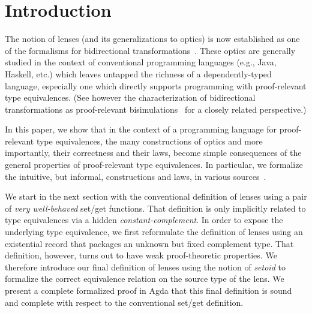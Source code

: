 \documentclass[sigplan,review,anonymous]{acmart}
\begin{document}
\section{Introduction}

The notion of lenses (and its generalizations to optics) is now
established as one of the formalisms for bidirectional
transformations~\cite{eaab8672ebea42538109e9f72ece5ed0}. These optics
are generally studied in the context of conventional programming
languages (e.g., Java, Haskell, etc.) which leaves untapped the
richness of a dependently-typed language, especially one which
directly supports programming with proof-relevant type
equivalences. (See however the characterization of bidirectional
transformations as proof-relevant
bisimulations~\cite{eaab8672ebea42538109e9f72ece5ed0} for a closely
related perspective.)

In this paper, we show that in the context of a programming language
for proof-relevant type equivalences, the many constructions of optics
and more importantly, their correctness and their laws, become simple
consequences of the general properties of proof-relevant type
equivalences. In particular, we formalize the intuitive, but informal,
constructions and laws, in various
sources~\cite{oleg-blog,Miltner:2017:SBL:3177123.3158089,laarhoven}.

We start in the next section with the conventional definition of
lenses using a pair of \emph{very well-behaved} set/get
functions. That definition is only implicitly related to type
equivalences via a hidden \emph{constant-complement}. In order to
expose the underlying type equivalence, we first reformulate the
definition of lenses using an existential record that packages an
unknown but fixed complement type. That definition, however, turns out
to have weak proof-theoretic properties. We therefore introduce our
final definition of lenses using the notion of \emph{setoid} to
formalize the correct equivalence relation on the source type of the
lens. We present a complete formalized proof in Agda that this final
definition is sound and complete with respect to the conventional
set/get definition.
\end{document}
